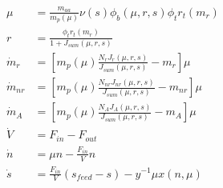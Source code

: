 \begin{align}
\begin{split}
\label{eq:full_model}
	 \mu &= \frac{m_{aa}}{m_p(\mu)} \nu(s) \phi_b(\mu,r,s) \phi_t r_t(m_r) \\
	 r &= \frac{\phi_t r_t(m_r)}{1+J_{sum}(\mu,r,s)} \\
	 \dot m_r &= \left[m_p(\mu) \frac{N_r J_r(\mu,r,s)}{J_{sum}(\mu,r,s)} - m_r \right] \mu \\
	 \dot m_{nr} &= \left[m_p(\mu) \frac{N_{nr} J_{nr}(\mu,r,s)}{J_{sum}(\mu,r,s)} - m_{nr}\right] \mu \\
	 \dot m_A &= \left[m_p(\mu) \frac{N_A J_A(\mu,r,s)}{J_{sum}(\mu,r,s)} - m_A \right] \mu \\
	 \dot V &= F_{in} - F_{out} \\
	 \dot n &= \mu n - \frac{F_{in}}{V} n \\
	 \dot s &= \frac{F_{in}}{V} (s_{feed} - s) - y^{-1} \mu x(n,\mu) 
\end{split}
\end{align}
